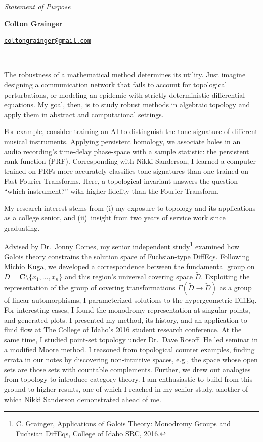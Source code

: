 \documentclass{article}
\makeatletter
\newcommand\textbox[1]{\parbox{.33\textwidth}{#1}}
\newcommand\printheader{\noindent
  \textbox{\emph{Statement of Purpose}}
  \textbox{\centerline{\large\bf Colton Grainger}}
  \textbox{\raggedleft \href{mailto:coltongrainger@gmail.com}{\texttt{coltongrainger@gmail.com}}\ }

  \vspace{-15pt}
  \noindent
  \rule{\textwidth}{1pt}\\
}
\makeatother
\begin{document}
 

\printheader

The robustness of a mathematical method determines its utility. Just
imagine designing a communication network that fails to account for
topological perturbations, or modeling an epidemic with strictly
deterministic differential equations. My goal, then, is to study robust methods in
algebraic topology and apply them in abstract and computational settings. 

For example, consider training an AI to distinguish the tone signature
of different musical instruments. Applying persistent homology, we
associate holes in an audio recording's time-delay phase-space with a
sample statistic: the persistent rank function (PRF). Corresponding with Nikki
Sanderson, I learned a computer trained on PRFs more
accurately classifies tone signatures than one trained on Fast Fourier Transforms. 
Here, a topological invariant answers the question ``which instrument?'' with higher 
fidelity than the Fourier Transform.

My research interest stems from (i) my exposure to topology and its
applications as a college senior, and (ii)~insight from two years of
service work since graduating.

Advised by Dr.~Jonny Comes, my senior independent study\footnote{C.
  Grainger,
  \href{http://coltongrainger.com/documents/cgrainger_coursework_galois_poster.pdf}{Applications
  of Galois Theory: Monodromy Groups and Fuchsian DiffEqs}, College of Idaho SRC, 2016.}
examined how Galois theory constrains the solution space of
Fuchsian-type DiffEqs. Following Michio Kuga, we developed a
correspondence between the fundamental group on
\(D = \mathbf{C}\setminus\{x_1,\ldots,x_n\}\) and this region's
universal covering space \(\tilde{D}\). Exploiting the representation of
the group of covering transformations
\(\Gamma(\tilde{D} \to \tilde{D})\) as a group of linear automorphisms,
I parameterized solutions to the hypergeometric DiffEq. For
interesting cases, I found the monodromy representation at singular
points, and generated plots. I presented my method, its history, and an
application to fluid flow at The College of Idaho's 2016 student
research conference. At the same time, I studied point-set topology
under Dr.~Dave Rosoff. He led seminar in a modified Moore method.
I reasoned from topological counter examples, finding errata in our notes by
discovering non-intuitive spaces, e.g., the space whose
open sets are those sets with countable complements.
Further, we drew out analogies from topology to introduce category theory.
I am enthusiastic to build from this ground to higher results,
one of which I reached in my senior study, another of which Nikki
Sanderson demonstrated ahead of me.
\end{document}
